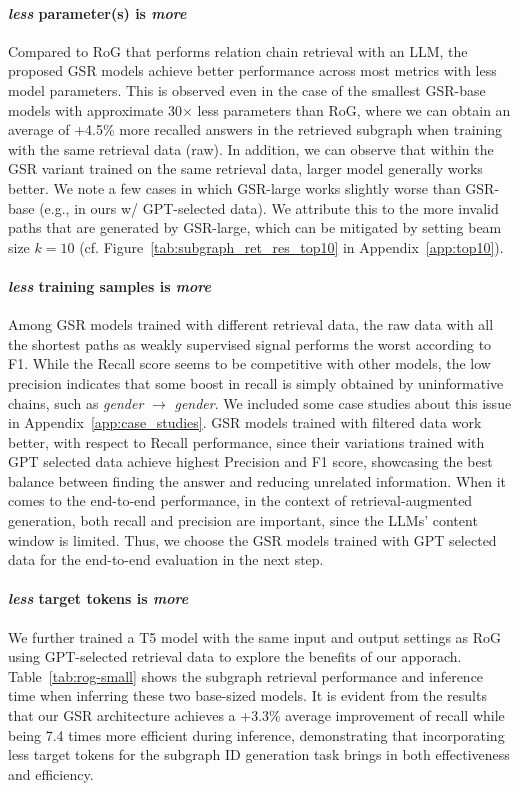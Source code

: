 \documentclass[11pt]{article}
\begin{document}
\paragraph{\emph{less} parameter(s) is \emph{more}}Compared to RoG that performs relation chain retrieval with an LLM, the proposed GSR models achieve better performance across most metrics with less model parameters. This is observed even in the case of the smallest GSR-base models with approximate 30$\times$ less parameters than RoG, where we can obtain an average of +4.5\% more recalled answers in the retrieved subgraph when training with the same retrieval data (raw). In addition, we can observe that within the GSR variant trained on the same retrieval data, larger model generally works better. We note a few cases in which GSR-large works slightly worse than GSR-base (e.g., in ours w/ GPT-selected data). We attribute this to the more invalid paths that are generated by GSR-large, which can be mitigated by setting beam size $k=10$ (cf. Figure~\ref{tab:subgraph_ret_res_top10} in Appendix~\ref{app:top10}).

\paragraph{\emph{less} training samples is \emph{more}}Among GSR models trained with different retrieval data, the raw data with all the shortest paths as weakly supervised signal performs the worst according to F1. While the Recall score seems to be competitive with other models, the low precision indicates that some boost in recall is simply obtained by uninformative chains, such as \textit{gender} $\rightarrow$ \textit{gender}. We included some case studies about this issue in Appendix~\ref{app:case_studies}. GSR models trained with filtered data work better, with respect to Recall performance, since their variations trained with GPT selected data achieve highest Precision and F1 score, showcasing the best balance between finding the answer and reducing unrelated information. 
When it comes to the end-to-end performance, in the context of retrieval-augmented generation, both recall and precision are important, since the LLMs' content window is limited. Thus, we choose the GSR models trained with GPT selected data for the end-to-end evaluation in the next step.

\paragraph{\emph{less} target tokens is \emph{more}}
We further trained a T5 model with the same input and output settings as RoG \citep{luo2024reasoning} using GPT-selected retrieval data to explore the benefits of our apporach. Table~\ref{tab:rog-small} shows the subgraph retrieval performance and inference time when inferring these two base-sized models. It is evident from the results that our GSR architecture achieves a +3.3\% average improvement of recall while being 7.4 times more efficient during inference, demonstrating that incorporating less target tokens for the subgraph ID generation task brings in both effectiveness and efficiency.
\end{document}
